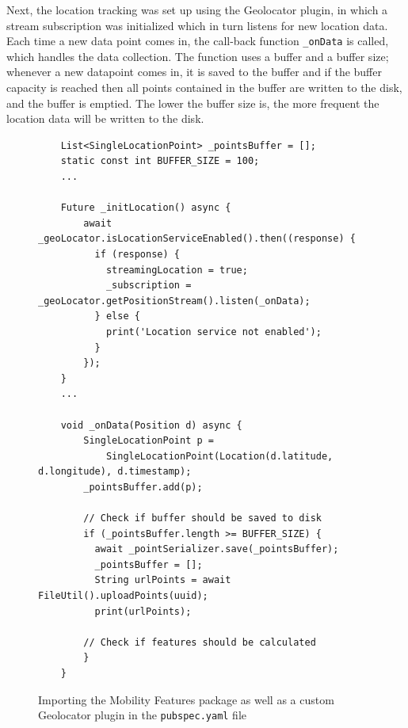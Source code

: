 Next, the location tracking was set up using the Geolocator plugin, in which a stream subscription was initialized which in turn listens for new location data. Each time a new data point comes in, the call-back function \verb|_onData| is called, which handles the data collection. The function uses a buffer and a buffer size; whenever a new datapoint comes in, it is saved to the buffer and if the buffer capacity is reached then all points contained in the buffer are written to the disk, and the buffer is emptied. The lower the buffer size is, the more frequent the location data will be written to the disk.

\begin{figure}
    \centering
    \begin{verbatim}
    List<SingleLocationPoint> _pointsBuffer = [];
    static const int BUFFER_SIZE = 100;
    ...
    
    Future _initLocation() async {
        await _geoLocator.isLocationServiceEnabled().then((response) {
          if (response) {
            streamingLocation = true;
            _subscription = _geoLocator.getPositionStream().listen(_onData);
          } else {
            print('Location service not enabled');
          }
        });
    }
    ...
    
    void _onData(Position d) async {
        SingleLocationPoint p =
            SingleLocationPoint(Location(d.latitude, d.longitude), d.timestamp);
        _pointsBuffer.add(p);
    
        // Check if buffer should be saved to disk
        if (_pointsBuffer.length >= BUFFER_SIZE) {
          await _pointSerializer.save(_pointsBuffer);
          _pointsBuffer = [];
          String urlPoints = await FileUtil().uploadPoints(uuid);
          print(urlPoints);
          
        // Check if features should be calculated
        }
    }
    \end{verbatim}
    \caption{Importing the Mobility Features package as well as a custom Geolocator plugin in the \verb|pubspec.yaml| file}
    \label{fig:import-package}
\end{figure}

